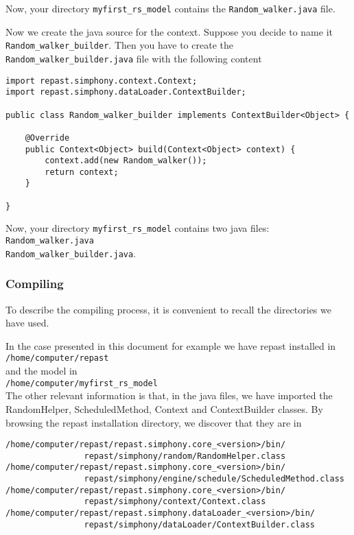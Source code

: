 \documentclass{article}
\begin{document}
Now, your directory \verb+myfirst_rs_model+ contains the \verb+Random_walker.java+ file.


Now we create the java source for the context. Suppose you decide to name it \verb+Random_walker_builder+. Then you have to create the \verb+Random_walker_builder.java+ file with the following content


\begin{verbatim}
import repast.simphony.context.Context;
import repast.simphony.dataLoader.ContextBuilder;

public class Random_walker_builder implements ContextBuilder<Object> {

	@Override
	public Context<Object> build(Context<Object> context) {
		context.add(new Random_walker());
		return context;
	}

}
\end{verbatim}

Now, your directory \verb+myfirst_rs_model+ contains two java files:\\
\verb+Random_walker.java+\\
\verb+Random_walker_builder.java+.


\subsubsection{Compiling}

To describe the compiling process, it is convenient to recall the directories we have used.

In the case presented in this document for example we have repast installed in\\
\verb+/home/computer/repast+\\
and the model in\\
\verb+/home/computer/myfirst_rs_model+\\

The other relevant information is that, in the java files, we have imported the RandomHelper, ScheduledMethod, Context and ContextBuilder classes. By browsing the repast installation directory, we discover that they are in \\

\begin{verbatim}
/home/computer/repast/repast.simphony.core_<version>/bin/
                repast/simphony/random/RandomHelper.class
/home/computer/repast/repast.simphony.core_<version>/bin/
                repast/simphony/engine/schedule/ScheduledMethod.class
/home/computer/repast/repast.simphony.core_<version>/bin/
                repast/simphony/context/Context.class
/home/computer/repast/repast.simphony.dataLoader_<version>/bin/
                repast/simphony/dataLoader/ContextBuilder.class
\end{verbatim}
\end{document}
